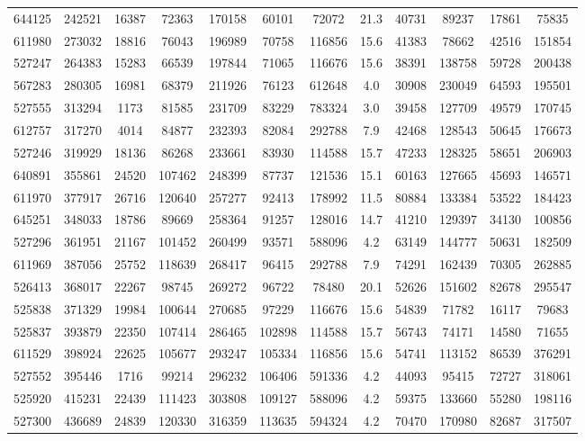 \documentclass[DM,lsstdraft,toc,usenatbib]{lsstdoc}
\begin{document}
\begin{table}
\begin{tabular}{cccccccccccc}
644125 & 242521 & 16387 & 72363 & 170158 & 60101 & 72072 & 21.3 & 40731 & 89237 & 17861 & 75835 \\
611980 & 273032 & 18816 & 76043 & 196989 & 70758 & 116856 & 15.6 & 41383 & 78662 & 42516 & 151854 \\
527247 & 264383 & 15283 & 66539 & 197844 & 71065 & 116676 & 15.6 & 38391 & 138758 & 59728 & 200438 \\
567283 & 280305 & 16981 & 68379 & 211926 & 76123 & 612648 & 4.0 & 30908 & 230049 & 64593 & 195501 \\
527555 & 313294 & 1173 & 81585 & 231709 & 83229 & 783324 & 3.0 & 39458 & 127709 & 49579 & 170745 \\
612757 & 317270 & 4014 & 84877 & 232393 & 82084 & 292788 & 7.9 & 42468 & 128543 & 50645 & 176673 \\
527246 & 319929 & 18136 & 86268 & 233661 & 83930 & 114588 & 15.7 & 47233 & 128325 & 58651 & 206903 \\
640891 & 355861 & 24520 & 107462 & 248399 & 87737 & 121536 & 15.1 & 60163 & 127665 & 45693 & 146571 \\
611970 & 377917 & 26716 & 120640 & 257277 & 92413 & 178992 & 11.5 & 80884 & 133384 & 53522 & 184423 \\
645251 & 348033 & 18786 & 89669 & 258364 & 91257 & 128016 & 14.7 & 41210 & 129397 & 34130 & 100856 \\
527296 & 361951 & 21167 & 101452 & 260499 & 93571 & 588096 & 4.2 & 63149 & 144777 & 50631 & 182509 \\
611969 & 387056 & 25752 & 118639 & 268417 & 96415 & 292788 & 7.9 & 74291 & 162439 & 70305 & 262885 \\
526413 & 368017 & 22267 & 98745 & 269272 & 96722 & 78480 & 20.1 & 52626 & 151602 & 82678 & 295547 \\
525838 & 371329 & 19984 & 100644 & 270685 & 97229 & 116676 & 15.6 & 54839 & 71782 & 16117 & 79683 \\
525837 & 393879 & 22350 & 107414 & 286465 & 102898 & 114588 & 15.7 & 56743 & 74171 & 14580 & 71655 \\
611529 & 398924 & 22625 & 105677 & 293247 & 105334 & 116856 & 15.6 & 54741 & 113152 & 86539 & 376291 \\
527552 & 395446 & 1716 & 99214 & 296232 & 106406 & 591336 & 4.2 & 44093 & 95415 & 72727 & 318061 \\
525920 & 415231 & 22439 & 111423 & 303808 & 109127 & 588096 & 4.2 & 59375 & 133660 & 55280 & 198116 \\
527300 & 436689 & 24839 & 120330 & 316359 & 113635 & 594324 & 4.2 & 70470 & 170980 & 82687 & 317507 \\

\end{tabular}
\end{table}
\end{document}
